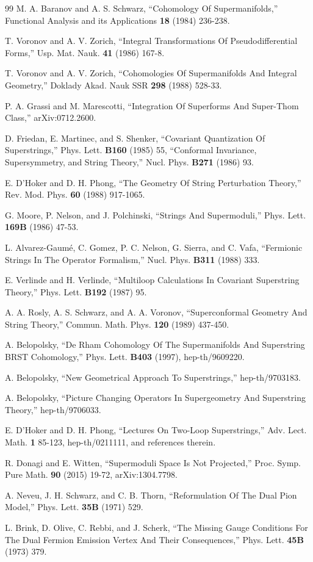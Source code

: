 \documentclass[11pt,a4paper]{article}
\begin{document}
\begin{thebibliography}{99}
M. A. Baranov and A. S. Schwarz, ``Cohomology Of Supermanifolds,'' Functional Analysis and its Applications {\bf 18} (1984) 236-238.

T. Voronov and A. V. Zorich, ``Integral Transformations Of Pseudodifferential Forms,'' Usp. Mat. Nauk. {\bf 41} (1986) 167-8.

T. Voronov and A. V. Zorich, ``Cohomologies Of Supermanifolds And Integral Geometry,'' Doklady Akad. Nauk SSR {\bf 298} (1988) 528-33.

P. A. Grassi and M. Marescotti, ``Integration Of Superforms And Super-Thom Class,'' arXiv:0712.2600.

 D. Friedan, E. Martinec, and S. Shenker, ``Covariant Quantization Of Superstrings,'' Phys. Lett. {\bf B160} (1985) 55,
``Conformal Invariance, Supersymmetry, and String Theory,'' Nucl. Phys. {\bf B271} (1986) 93.

E. D'Hoker and D. H. Phong, ``The Geometry Of String Perturbation Theory,'' Rev. Mod. Phys. {\bf 60} (1988) 917-1065.

G. Moore, P. Nelson, and J. Polchinski, ``Strings And Supermoduli,'' Phys. Lett. {\bf 169B} (1986) 47-53.

L. Alvarez-Gaum\'e, C. Gomez, P. C. Nelson, G. Sierra, and C. Vafa, ``Fermionic Strings In The Operator Formalism,'' Nucl. Phys. {\bf B311} (1988) 333.

E. Verlinde and H. Verlinde, ``Multiloop Calculations In Covariant Superstring Theory,'' Phys. Lett. {\bf B192} (1987) 95. 

A. A. Rosly, A. S. Schwarz, and A. A. Voronov, ``Superconformal Geometry And String Theory,'' Commun. Math. Phys. {\bf 120} (1989) 437-450.

A. Belopolsky, ``De Rham Cohomology Of The Supermanifolds And Superstring BRST Cohomology,''
Phys. Lett. {\bf B403} (1997), hep-th/9609220.

A. Belopolsky, ``New Geometrical Approach To Superstrings,'' hep-th/9703183.

A. Belopolsky, ``Picture Changing Operators In Supergeometry And Superstring Theory,'' hep-th/9706033.



E. D'Hoker and D. H. Phong, ``Lectures On Two-Loop Superstrings,'' Adv. Lect. Math. {\bf 1} 85-123, hep-th/0211111, and references therein.

R. Donagi and E. Witten, ``Supermoduli Space Is Not Projected,'' Proc. Symp. Pure Math. {\bf 90} (2015) 19-72,
arXiv:1304.7798.

A. Neveu, J. H. Schwarz, and C. B. Thorn, ``Reformulation Of The Dual Pion Model,'' Phys. Lett. {\bf 35B} (1971) 529.

L. Brink, D. Olive, C. Rebbi, and J. Scherk, ``The Missing Gauge Conditions For The Dual Fermion Emission Vertex And Their Consequences,''
Phys. Lett. {\bf 45B} (1973) 379.


\end{thebibliography}
\end{document}
